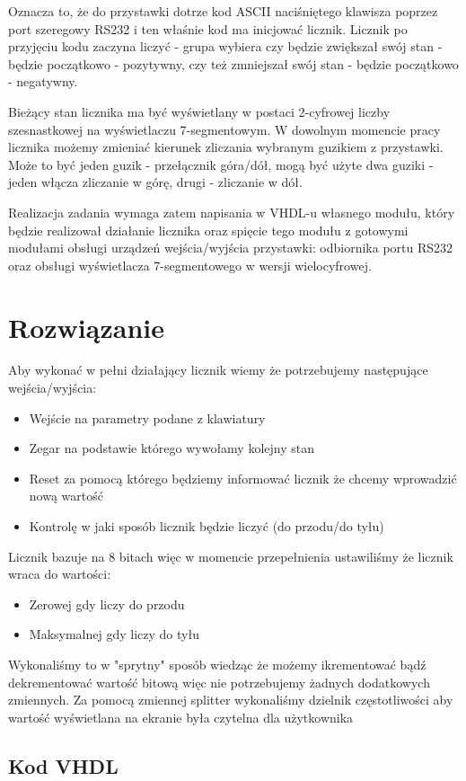 \documentclass[a4paper,12pt]{extarticle}  %
\begin{document}
Oznacza to, że do przystawki dotrze kod ASCII naciśniętego klawisza poprzez port
szeregowy RS232 i ten właśnie kod ma inicjować licznik.
Licznik po przyjęciu kodu zaczyna liczyć - grupa wybiera czy będzie zwiększał swój
stan - będzie początkowo - pozytywny, czy też zmniejszał swój stan - będzie
początkowo - negatywny.

Bieżący stan licznika ma być wyświetlany w postaci 2-cyfrowej liczby szesnastkowej
na wyświetlaczu 7-segmentowym. W dowolnym momencie pracy licznika możemy
zmieniać kierunek zliczania wybranym guzikiem z przystawki. Może to być jeden guzik
- przełącznik góra/dół, mogą być użyte dwa guziki - jeden włącza zliczanie w górę,
drugi - zliczanie w dół.

Realizacja zadania wymaga zatem napisania w VHDL-u własnego modułu, który będzie
realizował działanie licznika oraz spięcie tego modułu z gotowymi modułami obsługi
urządzeń wejścia/wyjścia przystawki: odbiornika portu RS232 oraz obsługi
wyświetlacza 7-segmentowego w wersji wielocyfrowej.
\section{Rozwiązanie}
Aby wykonać w pełni działający licznik wiemy że potrzebujemy następujące wejścia/wyjścia:
\begin{itemize}
	\item Wejście na parametry podane z klawiatury
	\item Zegar na podstawie którego wywołamy kolejny stan
	\item Reset za pomocą którego będziemy informować licznik że chcemy wprowadzić nową wartość
	\item Kontrolę w jaki sposób licznik będzie liczyć (do przodu/do tyłu)
\end{itemize}
Licznik bazuje na 8 bitach więc w momencie przepełnienia ustawiliśmy że licznik wraca do wartości:
\begin{itemize}
	\item Zerowej gdy liczy do przodu
	\item Maksymalnej gdy liczy do tyłu
\end{itemize}
Wykonaliśmy to w "sprytny" sposób wiedząc że możemy ikrementować bądź dekrementować wartość bitową więc nie potrzebujemy żadnych dodatkowych zmiennych.
Za pomocą zmiennej splitter wykonaliśmy dzielnik częstotliwości aby wartość wyświetlana na ekranie była czytelna dla użytkownika
\subsection{Kod VHDL}

\end{document}
